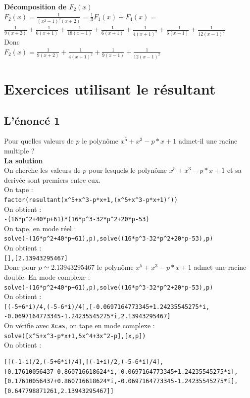 \documentclass[a4paper,11pt]{book}
\begin{document}
{\bf D\'ecomposition de  $F_2(x)$}\\
$\displaystyle  F_2(x)=\frac{1}{(x^2-1)^2(x+2)}=\frac{1}{3}F_1(x)+F_4(x)=$\\
$\displaystyle \frac{1}{9(x+2)}+\frac{-1}{6(x+1)}+\frac{1}{18(x-1)}+\frac{1}{6(x+1)}+\frac{1}{4(x+1)^2}+\frac{-1}{6(x-1)}+\frac{1}{12(x-1)^2}$\\
Donc \\
$\displaystyle F_2(x)=\frac{1}{9(x+2)}+\frac{1}{4(x+1)^2}+\frac{1}{9(x-1)}+\frac{1}{12(x-1)^2}$


\section{Exercices utilisant le r\'esultant}
\subsection{L'\'enonc\'e 1}
Pour quelles valeurs de $p$ le polyn\^ome $x^5+x^3-p*x+1$ admet-il une racine 
multiple ?\\
{\bf La solution}\\
On cherche les valeurs de $p$ pour lesquels le polyn\^ome $x^5+x^3-p*x+1$ et sa 
deriv\'ee sont premiers entre eux. \\
On tape :\\
{\tt factor(resultant(x\verb|^|5+x\verb|^|3-p*x+1,(x\verb|^|5+x\verb|^|3-p*x+1)'))}\\
On obtient :\\
{\tt -(16*p\verb|^|2+40*p+61)*(16*p\verb|^|3-32*p\verb|^|2+20*p-53)}\\
On tape, en mode r\'eel :\\
{\tt solve(-(16*p\verb|^|2+40*p+61),p),solve((16*p\verb|^|3-32*p\verb|^|2+20*p-53),p)}\\
On obtient :\\
{\tt [],[2.13943295467]}\\
Donc pour $p\simeq 2.13943295467$ le polyn\^ome $x^5+x^3-p*x+1$ admet une 
racine double.
En mode complexe :\\
{\tt solve(-(16*p\verb|^|2+40*p+61),p),solve((16*p\verb|^|3-32*p\verb|^|2+20*p-53),p)}\\
On obtient :\\
{\tt [(-5+6*i)/4,(-5-6*i)/4],[-0.0697164773345+1.24235545275*i,\\
-0.0697164773345-1.24235545275*i,2.13943295467]}\\
On v\'erifie avec {\tt Xcas}, on tape en mode complexe :\\
{\tt solve([x\verb|^|5+x\verb|^|3-p*x+1,5x\verb|^|4+3x\verb|^|2-p],[x,p])}\\
On obtient :
\begin{verbatim}
[[(-1-i)/2,(-5+6*i)/4],[(-1+i)/2,(-5-6*i)/4],
[0.17610056437-0.860716618624*i,-0.0697164773345+1.24235545275*i],
[0.17610056437+0.860716618624*i,-0.0697164773345-1.24235545275*i],
[0.647798871261,2.13943295467]]
\end{verbatim}
\end{document}
